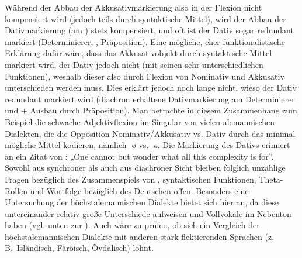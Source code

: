 Während der Abbau der Akkusativmarkierung also in der Flexion nicht kompensiert wird (jedoch teils durch syntaktische Mittel), wird der Abbau der Dativmarkierung (am ) stets kompensiert, und oft ist der Dativ sogar redundant markiert (Determinierer, , Präposition). Eine mögliche, eher funktionalistische Erklärung dafür wäre, dass das Akkusativobjekt durch syntaktische Mittel markiert wird, der Dativ jedoch nicht (mit seinen sehr unterschiedlichen Funktionen), weshalb dieser also durch Flexion von Nominativ und Akkusativ unterschieden werden muss. Dies erklärt jedoch noch lange nicht, wieso der Dativ redundant markiert wird (diachron erhaltene Dativmarkierung am Determinierer und  + Ausbau durch Präposition). Man betrachte in diesem Zusammenhang zum Beispiel die schwache Adjektivflexion im Singular von vielen alemannischen Dialekten, die die Opposition Nominativ/Akkusativ vs. Dativ durch das minimal mögliche Mittel kodieren, nämlich -ø vs. -ə. Die Markierung des Dativs erinnert an ein Zitat von \citet[31]{Gil2009}: „One cannot but wonder what all this complexity is for”. Sowohl aus synchroner als auch aus diachroner Sicht bleiben folglich unzählige Fragen bezüglich des Zusammenspiels von , syntaktischen Funktionen, Theta-Rollen und Wortfolge bezüglich des Deutschen offen. Besonders eine Untersuchung der höchstalemannischen Dialekte bietet sich hier an, da diese untereinander relativ große Unterschiede aufweisen und Vollvokale im Nebenton haben (vgl. unten zur ). Auch wäre zu prüfen, ob sich ein Vergleich der höchstalemannischen Dialekte mit anderen stark flektierenden Sprachen (z.\,B.\ Isländisch, Färöisch, Övdalisch) lohnt.


